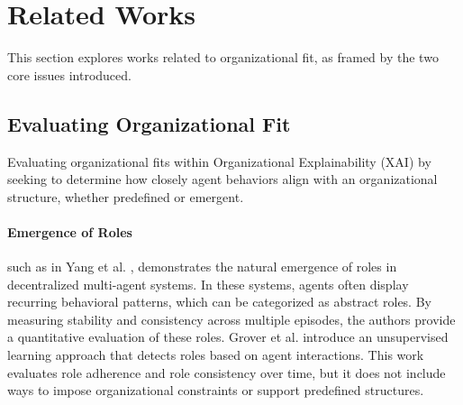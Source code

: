 \documentclass[sigconf,anonymous]{aamas}
\begin{document}



\section{Related Works}
\label{sec:related_works}

This section explores works related to organizational fit, as framed by the two core issues introduced.

\subsection{Evaluating Organizational Fit}
Evaluating organizational fits within Organizational Explainability (XAI) by seeking to determine how closely agent behaviors align with an organizational structure, whether predefined or emergent. %

\paragraph{Emergence of Roles}
such as in Yang et al. \cite{yang2021role}, demonstrates the natural emergence of roles in decentralized multi-agent systems. In these systems, agents often display recurring behavioral patterns, which can be categorized as abstract roles. By measuring stability and consistency across multiple episodes, the authors provide a quantitative evaluation of these roles.
Grover et al. \cite{grover2018role} introduce an unsupervised learning approach that detects roles based on agent interactions. This work evaluates role adherence and role consistency over time, but it does not include ways to impose organizational constraints or support predefined structures.
\end{document}
